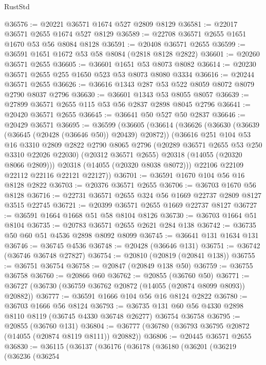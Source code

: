 \begin{lexlean}{RustStd}
\begin{coremodule}
@36576 := @20221 @36571 @1674 @527 @2809 @8129
@36581 := @22017 @36571 @2655 @1674 @527 @8129
@36589 := @22708 @36571 @2655 @1651 @1670 @53 @56 @8084 @8128
@36591 := @20408 @36571 @2655
@36599 := @36591 @1651 @1672 @53 @58 @8084 (@2818 @8128 @2822)
@36601 := @20260 @36571 @2655
@36605 := @36601 @1651 @53 @8073 @8082
@36614 := @20230 @36571 @2655 @255 @1650 @523 @53 @8073 @8080 @3334
@36616 := @20244 @36571 @2655
@36626 := @36616 @1343 @287 @53 @522 @8059 @8072 @8079 @2790 @8037 @2796
@36630 := @36601 @1343 @53 @8055 @8057
@36639 := @27899 @36571 @2655 @115 @53 @56 @2837 @2898 @8045 @2796
@36641 := @20420 @36571 @2655
@36645 := @36641 @50 @527 @50 @2837
@36646 := @20429 @36571
@36695 := @36599
    (@36605
      (@36614
        (@36626
          (@36630 (@36639 (@36645 (@20428 (@36646 @50)) @20439) @20872))
          (@36616
            @251
            @104
            @53
            @16
            @3310
            @2809
            @2822
            @2790
            @8065
            @2796
            (@20289 @36571 @2655 @53 @250 @3310 @22026 @22030)
            (@20312 @36571 @2655)
            @20318
            (@14055 (@20320 @8066 @2809)))
          @20318
          (@14055 (@20320 @8038 @8072)))
        @22106
        @22109
        @22112
        @22116
        @22121
        @22127))
@36701 := @36591 @1670 @104 @56 @16 @8128 @2822
@36703 := @20376 @36571 @2655
@36706 := @36703 @1670 @56 @8128
@36716 := @22731 @36571 @2655 @324 @56 @1669 @22737 @2809 @8127 @3515 @22745
@36721 := @20399 @36571 @2655 @1669 @22737 @8127
@36727 := @36591 @1664 @1668 @51 @58 @8104 @8126
@36730 := @36703 @1664 @51 @8104
@36735 := @20783 @36571 @2655 @2621 @284 @138
@36742 := @36735 @50 @60 @51 @4536 @2898 @8092 @8099
@36745 := @36641 @131 @1634 @131
@36746 := @36745 @4536
@36748 := @20428 (@36646 @131)
@36751 := @36742 (@36746 @36748 @27827)
@36754 := @20810 (@20819 (@20841 @138))
@36755 := @36751 @36754
@36758 := @20847 (@20849 @138 @50)
@36759 := @36755 @36758
@36760 := @20866 @60
@36762 := @20855 (@36760 @50)
@36771 := @36727 (@36730 (@36759 @36762 @20872 (@14055 (@20874 @8099 @8093)) @20882))
@36777 := @36591 @1666 @104 @56 @16 @8124 @2822
@36780 := @36703 @1666 @56 @8124
@36793 := @36735 @131 @60 @56 @4330 @2898 @8110 @8119 (@36745 @4330 @36748 @26277) @36754 @36758
@36795 := @20855 (@36760 @131)
@36804 := @36777 (@36780 (@36793 @36795 @20872 (@14055 (@20874 @8119 @8111)) @20882))
@36806 := @20445 @36571 @2655
@36830 := @36115
    (@36137
      (@36176
        (@36178
          (@36180
            (@36201
              (@36219
                (@36236
                  (@36254

\end{coremodule}
\end{lexlean}

